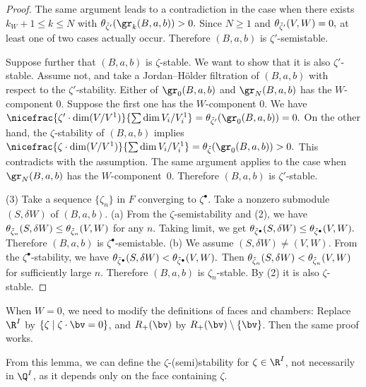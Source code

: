 \begin{proof}
The same argument leads to a contradiction in the case when
there exists $k_W+1 \le k \le N$ with
\(
   \theta_{\Tilde\zeta'}(\gr_k(B,a,b)) > 0.
\)
Since $N\ge 1$ and
\(
   \theta_{\Tilde\zeta'}(V,W) = 0,
\)
at least one of two cases actually occur. Therefore $(B,a,b)$ is
$\zeta'$-semistable.

Suppose further that $(B,a,b)$ is $\zeta$-stable. We want to show that
it is also $\zeta'$-stable. Assume not, and take a Jordan--H\"older
f\/iltration of $(B,a,b)$ with respect to the $\zeta'$-stability. Either
of $\gr_0(B,a,b)$ and $\gr_N(B,a,b)$ has the $W$-component $0$. Suppose
the f\/irst one has the $W$-component $0$. We have
\(
   \nicefrac{\zeta'\cdot \dim (V/V^1)}{\sum \dim V_i/V^1_i} =
   \theta_{\Tilde\zeta'}(\gr_0(B,a,b)) = 0.
\)
On the other hand, the $\zeta$-stability of $(B,a,b)$ implies
\(
   \nicefrac{\zeta\cdot \dim (V/V^1)}{\sum \dim V_i/V^1_i} =
   \theta_{\Tilde\zeta}(\gr_0(B,a,b)) > 0.
\)
This contradicts with the assumption. The same argument applies
to the case when $\gr_N(B,a,b)$ has the $W$-component~$0$. Therefore
$(B,a,b)$ is $\zeta'$-stable.

(3) Take a sequence $\{ \zeta_n \}$ in $F$ converging to $\zeta^\bullet$.
Take a nonzero submodule $(S,\delta W)$ of $(B,a,b)$.
%
(a) From the $\zeta$-semistability and (2), we have
\(
   \theta_{\Tilde\zeta_n}(S,\delta W) \le
   \theta_{\Tilde\zeta_n}(V, W)
\)
for any $n$. Taking limit, we get
\(
   \theta_{\Tilde\zeta^\bullet}(S,\delta W) \le
   \theta_{\Tilde\zeta^\bullet}(V,W).
\)
Therefore $(B,a,b)$ is $\zeta^\bullet$-semistable.
%
(b) We assume $(S,\delta W) \neq (V,W)$.
From the $\zeta^\bullet$-stability, we have
\(
   \theta_{\Tilde\zeta^\bullet}(S,\delta W) <
   \theta_{\Tilde\zeta^\bullet}(V,W).
\)
Then
\(
   \theta_{\Tilde\zeta_n}(S,\delta W) <
   \theta_{\Tilde\zeta_n}(V,W)
\)
for suf\/f\/iciently large $n$. Therefore $(B,a,b)$ is
$\zeta_n$-stable. By (2) it is also $\zeta$-stable.
\end{proof}

\begin{Remark}\label{rem:W=0reg}
  When $W=0$, we need to modify the def\/initions of faces and chambers:
  Replace $\R^I$ by $\{ \zeta \mid \zeta\cdot\bv = 0\}$, and
  $R_+(\bv)$ by $R_+(\bv)\setminus\{\bv\}$. Then the same proof works.
\end{Remark}

From this lemma, we can def\/ine the $\zeta$-(semi)stability for
$\zeta\in \R^I$, not necessarily in $\Q^I$, as it depends only on the
face containing $\zeta$.

